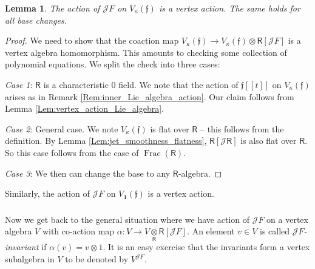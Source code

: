 \documentclass{amsart}
\newtheorem{Lem}[Thm]{Lemma}
\theoremstyle{definition}
\newcommand{\sss}{\subsubsection{}}
\newcommand{\Ring}{\mathsf{R}}
\newcommand{\g}{\mathfrak{g}}
\newcommand{\Jet}{\mathscr{J}}
\newcommand{\ff}{\mathfrak{f}}
\newcommand{\bone}{\mathbf{1}}
\numberwithin{equation}{section}
\begin{document}
\begin{Lem}\label{Lem:vertex_algebra_action_example} The action of $\Jet F$ on $V_\kappa(\mathfrak{f})$ is a vertex  action. The same holds for all base changes. 
\end{Lem}
\begin{proof}
We need to show that the coaction map 
$V_\kappa(\mathfrak{f})\rightarrow V_\kappa(\mathfrak{f})\otimes \Ring[\Jet F]$ is a vertex algebra homomorphism. This amounts to checking some collection of polynomial equations. We split the check into three cases:

{\it Case 1}: $\Ring$ is a characteristic $0$ field.
We note that the action of $\mathfrak{f}[[t]]$ on $V_\kappa(\mathfrak{f})$ arises as in Remark \ref{Rem:inner_Lie_algebra_action}. Our claim follows from
Lemma \ref{Lem:vertex_action_Lie_algebra}.

{\it Case 2}: General case. We note $V_\kappa(\mathfrak{f})$ is flat over $\Ring$ -- this follows from the definition. By Lemma \ref{Lem:jet_smoothness_flatness}, $\Ring[\Jet \Ring]$ is also flat over $\Ring$. So this case follows from the case of $\operatorname{Frac}(\Ring)$.  

{\it Case 3}: We then can change the base to any $\Ring$-algebra.
\end{proof}

Similarly, the action of $\Jet F$ on $V_{\bone}(\ff)$ is a vertex action.

\sss
Now we get back to the general situation where we have action of $\Jet F$ on a vertex algebra $V$ with co-action map $\alpha:V\rightarrow V \underset{\Ring}\otimes \Ring[\Jet F]$. An element 
$v\in V$ is called {\it $\Jet F$-invariant} if $\alpha(v)=v\otimes 1$. 
It is an easy exercise that the invariants form a vertex subalgebra in $V$ to be denoted by $V^{\Jet F}$.

\end{document}
